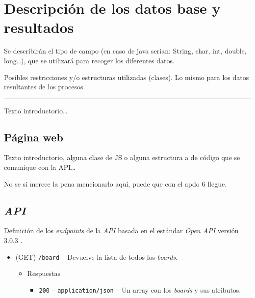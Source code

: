 \documentclass[12pt,a4paper,titlepage]{article}
\begin{document}

    \section{Descripción de los datos base y resultados}

    Se describirán el tipo de campo (en caso de java serían: String, char, int, double, long\dots), que se utilizará para recoger los diferentes datos.

    Posibles restricciones y/o estructuras utilizadas (clases). Lo mismo para los datos resultantes de los procesos.

    \bigskip\hrule\bigskip

    Texto introductorio\dots

    \subsection{Página web}

    Texto introductorio, alguna clase de JS o alguna estructura a de código que se comunique con la API\dots

    No se si merece la pena mencionarlo aquí, puede que con el apdo 6 llegue.

    \subsection{\textit{API}}

    Definición de los \textit{endpoints} de la \textit{API} basada en el estándar \textit{Open API} versión 3.0.3 \cite{swagger:specification}.

    \begin{itemize}
        \item (GET) \texttt{/board} -- Devuelve la lista de todos los \textit{boards}.
        \begin{itemize}
            \item Respuestas
            \begin{itemize}
                \item \texttt{200} -- \texttt{application/json} -- Un array con los \textit{boards} y sus atributos.
            \end{itemize}
        \end{itemize}
    \end{itemize}

    
\end{document}
